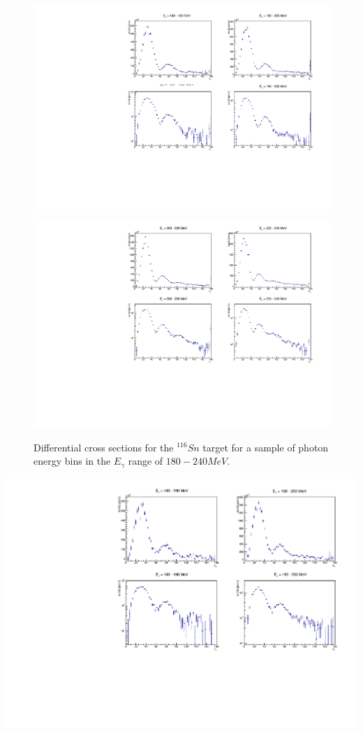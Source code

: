 \begin{figure}[H]
\begin{center}
\includegraphics[scale=0.55]{pictures/pdf/sn116_cross_section_1.pdf}
\includegraphics[scale=0.55]{pictures/pdf/sn116_cross_section_2.pdf}
\caption{Differential cross sections for the $^{116}Sn$ target for a sample of photon energy bins in the $E_{\gamma}$ range of $180 - 240 MeV$.}
\label{cross_section1}
\end{center}
\end{figure}
\includegraphics[scale=0.55]{pictures/pdf/sn120_cross_section_1.pdf}

